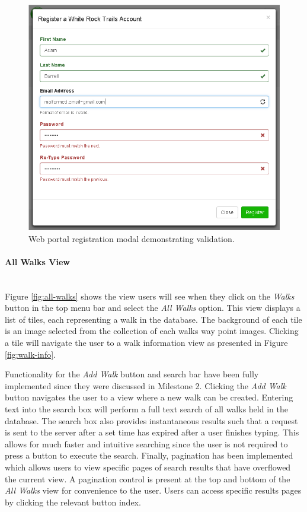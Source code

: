 \documentclass[11pt,a4paper]{report}
\begin{document}
\begin{figure}[H]

\centering

\includegraphics[width=0.7\linewidth]{./img/webportal/registration}

\caption{Web portal registration modal demonstrating validation.}

\label{fig:registration}

\end{figure}



\paragraph{All Walks View}\mbox{}\\
Figure \ref{fig:all-walks} shows the view users will see when they click on the \emph{Walks} button in the top menu bar and select the \emph{All Walks} option. This view displays a list of tiles, each representing a walk in the database. The background of each tile is an image selected from the collection of each walks way point images. Clicking a tile will navigate the user to a walk information view as presented in Figure \ref{fig:walk-info}\cite{milestone2}. 

Functionality for the \emph{Add Walk} button and search bar have been fully implemented since they were discussed in Milestone 2. Clicking the \emph{Add Walk} button navigates the user to a view where a new walk can be created. Entering text into the search box will perform a full text search of all walks held in the database. The search box also provides instantaneous results such that a request is sent to the server after a set time has expired after a user finishes typing. This allows for much faster and intuitive searching since the user is not required to press a button to execute the search. Finally, pagination has been implemented which allows users to view specific pages of search results that have overflowed the current view. A pagination control is present at the top and bottom of the \emph{All Walks} view for convenience to the user. Users can access specific results pages by clicking the relevant button index. 
\end{document}

